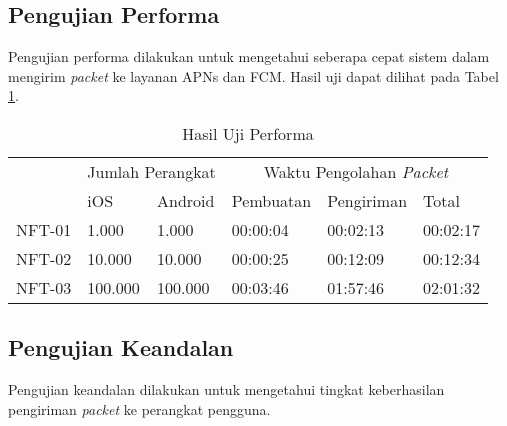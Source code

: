 \subsection{Pengujian Performa}
\par Pengujian performa dilakukan untuk mengetahui seberapa cepat sistem dalam mengirim \textit{packet} ke layanan APNs dan FCM. Hasil uji dapat dilihat pada Tabel \ref{t:performa}.
\begin{longtable}{|p{1.3cm}|p{1.3cm}|p{1.3cm}|p{1.8cm}|p{1.8cm}|p{1.8cm}|}
	\caption{Hasil Uji Performa} \label{t:performa} \\ \hline
	\rowcolor{lightgray} & \multicolumn{2}{c|}{Jumlah Perangkat} & \multicolumn{3}{c|}{Waktu Pengolahan \textit{Packet}} \\ \hhline{~|*5{-}|}
	\rowcolor{lightgray} \multirow{-2}{*}{Kode} & iOS & Android & Pembuatan & Pengiriman & Total \\ \hline
	NFT-01 & 1.000 & 1.000 & 00:00:04 & 00:02:13 & 00:02:17 \\ \hline
	NFT-02 & 10.000 & 10.000 & 00:00:25 & 00:12:09 & 00:12:34 \\ \hline
	NFT-03 & 100.000 & 100.000 & 00:03:46 & 01:57:46 & 02:01:32 \\ \hline
\end{longtable}

\subsection{Pengujian Keandalan}
\par Pengujian keandalan dilakukan untuk mengetahui tingkat keberhasilan pengiriman \textit{packet} ke perangkat pengguna.


